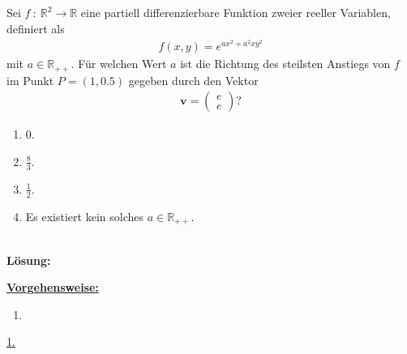 \subsection*{}
Sei $ f \ : \ \mathbb{R}^2 \to \mathbb{R} $ eine partiell differenzierbare Funktion zweier reeller Variablen, definiert als 
\begin{align*}
	f(x,y) = e^{ax^2 +a^2 xy^2}
\end{align*}
mit $ a \in \mathbb{R}_{++} $. Für welchen Wert $ a $ ist die Richtung des steilsten Anstiegs von $ f $ im Punkt $ P = (1,0.5) $ gegeben durch den Vektor
\begin{align*}
	\textbf{v} =
	\begin{pmatrix}
		e\\
		e
	\end{pmatrix}?
\end{align*}
\renewcommand{\labelenumi}{(\alph{enumi})}
\begin{enumerate}
	\item 
	$0 $.
	\item
	$\frac{8}{3}$.
	\item
	$\frac{1}{2}$.
	\item
	Es existiert kein solches $ a \in \mathbb{R}_{++} $.
\end{enumerate}
\ \\
\textbf{Lösung:}
\begin{mdframed}
\underline{\textbf{Vorgehensweise:}}
\renewcommand{\labelenumi}{\theenumi.}
\begin{enumerate}
\item 
\end{enumerate}
\end{mdframed}

\underline{1. }\\


\newpage
